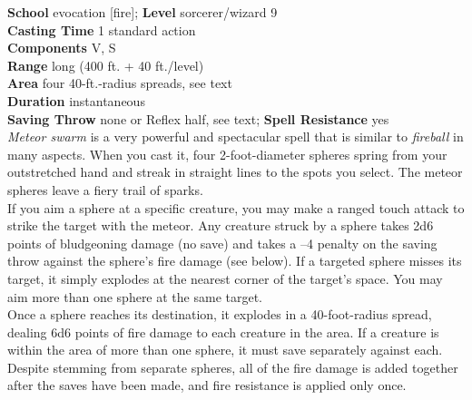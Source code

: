 \textbf{School }evocation [fire]; \textbf{Level }sorcerer/wizard 9\\
\textbf{Casting Time }1 standard action\\
\textbf{Components }V, S\\
\textbf{Range }long (400 ft. + 40 ft./level)\\
\textbf{Area }four 40-ft.-radius spreads, see text\\
\textbf{Duration }instantaneous\\
\textbf{Saving Throw} none or Reflex half, see text; \textbf{Spell Resistance} yes\\
\textit{Meteor swarm }is a very powerful and spectacular spell that is similar to \textit{fireball }in many aspects. When you cast it, four 2-foot-diameter spheres spring from your outstretched hand and streak in straight lines to the spots you select. The meteor spheres leave a fiery trail of sparks.\\
If you aim a sphere at a specific creature, you may make a ranged touch attack to strike the target with the meteor. Any creature struck by a sphere takes 2d6 points of bludgeoning damage (no save) and takes a –4 penalty on the saving throw against the sphere's fire damage (see below). If a targeted sphere misses its target, it simply explodes at the nearest corner of the target's space. You may aim more than one sphere at the same target.\\
Once a sphere reaches its destination, it explodes in a 40-foot-radius spread, dealing 6d6 points of fire damage to each creature in the area. If a creature is within the area of more than one sphere, it must save separately against each. Despite stemming from separate spheres, all of the fire damage is added together after the saves have been made, and fire resistance is applied only once.\\
